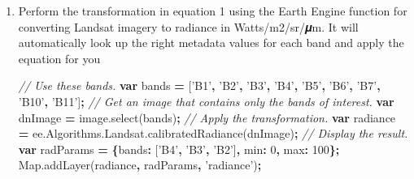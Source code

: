 \documentclass[
]{article}
\newenvironment{Shaded}{\begin{snugshade}}{\end{snugshade}}
\newcommand{\AttributeTok}[1]{\textcolor[rgb]{0.77,0.63,0.00}{#1}}
\newcommand{\CommentTok}[1]{\textcolor[rgb]{0.56,0.35,0.01}{\textit{#1}}}
\newcommand{\DataTypeTok}[1]{\textcolor[rgb]{0.13,0.29,0.53}{#1}}
\newcommand{\DecValTok}[1]{\textcolor[rgb]{0.00,0.00,0.81}{#1}}
\newcommand{\KeywordTok}[1]{\textcolor[rgb]{0.13,0.29,0.53}{\textbf{#1}}}
\newcommand{\NormalTok}[1]{#1}
\newcommand{\OperatorTok}[1]{\textcolor[rgb]{0.81,0.36,0.00}{\textbf{#1}}}
\newcommand{\StringTok}[1]{\textcolor[rgb]{0.31,0.60,0.02}{#1}}
\newcommand{\VariableTok}[1]{\textcolor[rgb]{0.00,0.00,0.00}{#1}}
\begin{document}
\begin{enumerate}
\def\labelenumi{\alph{enumi}.}
\item
  Perform the transformation in equation 1 using the Earth Engine function for converting Landsat imagery to radiance in Watts/m2/sr/𝝁m. It will automatically look up the right metadata values for each band and apply the equation for you

\begin{Shaded}
\begin{Highlighting}[]
\CommentTok{//  Use these bands.    }
\KeywordTok{var}\NormalTok{ bands }\OperatorTok{=}\NormalTok{ [}\StringTok{'B1'}\OperatorTok{,} \StringTok{'B2'}\OperatorTok{,} \StringTok{'B3'}\OperatorTok{,} \StringTok{'B4'}\OperatorTok{,} \StringTok{'B5'}\OperatorTok{,} \StringTok{'B6'}\OperatorTok{,} \StringTok{'B7'}\OperatorTok{,} \StringTok{'B10'}\OperatorTok{,} \StringTok{'B11'}\NormalTok{]}\OperatorTok{;}  
\CommentTok{// Get an image that  contains only the bands of interest.   }
\KeywordTok{var}\NormalTok{ dnImage }\OperatorTok{=} \VariableTok{image}\NormalTok{.}\AttributeTok{select}\NormalTok{(bands)}\OperatorTok{;}  
\CommentTok{// Apply the  transformation.   }
\KeywordTok{var}\NormalTok{ radiance }\OperatorTok{=}  \VariableTok{ee}\NormalTok{.}\VariableTok{Algorithms}\NormalTok{.}\VariableTok{Landsat}\NormalTok{.}\AttributeTok{calibratedRadiance}\NormalTok{(dnImage)}\OperatorTok{;}  
\CommentTok{// Display the result.   }
\KeywordTok{var}\NormalTok{ radParams }\OperatorTok{=} \OperatorTok{\{}\DataTypeTok{bands}\OperatorTok{:}\NormalTok{ [}\StringTok{'B4'}\OperatorTok{,} \StringTok{'B3'}\OperatorTok{,} \StringTok{'B2'}\NormalTok{]}\OperatorTok{,} \DataTypeTok{min}\OperatorTok{:} \DecValTok{0}\OperatorTok{,} \DataTypeTok{max}\OperatorTok{:} \DecValTok{100}\OperatorTok{\};}   
\VariableTok{Map}\NormalTok{.}\AttributeTok{addLayer}\NormalTok{(radiance}\OperatorTok{,}\NormalTok{ radParams}\OperatorTok{,} \StringTok{'radiance'}\NormalTok{)}\OperatorTok{;}  
\end{Highlighting}
\end{Shaded}


\end{enumerate}
\end{document}
